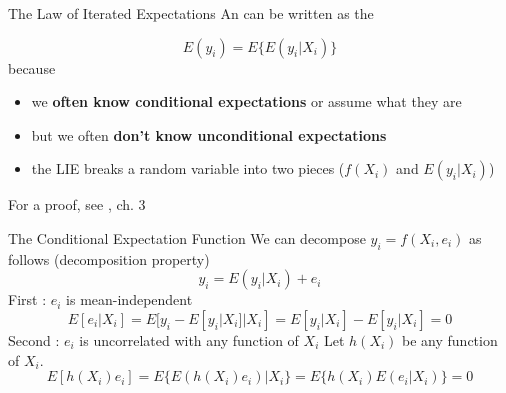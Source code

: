 \begin{frame}{The Law of Iterated Expectations}
An  can be written as the 

\begin{equation}
E(y_i)=E\{E(y_i| X_i)\}
\label{eq3}
\end{equation}
\vfill
{} because 
\begin{itemize}
\item we \textbf{often know conditional expectations} or assume what they are
\item but we often \textbf{don't know unconditional expectations}
\item the LIE breaks a random variable into two pieces ($f(X_i)$ and $E(y_i|X_i)$)
\end{itemize}
\vfill
For a proof, see \citet{angrist_2009}, ch. 3
\end{frame}


\begin{frame}{The Conditional Expectation Function}
We can decompose $y_i=f(X_i,e_i)$ as follows (decomposition property)
\begin{equation}
y_i=E(y_i|X_i)+e_i
\label{eq4}
\end{equation}
\vfill
First : $e_i$ is mean-independent
\begin{equation}
E[e_i|X_i]=E[y_i-E[y_i|X_i]|X_i]=E[y_i|X_i]-E[y_i|X_i]=0
\label{eq5}
\end{equation}
\vfill
\pause
Second : $e_i$ is uncorrelated with any function of $X_i$
\vfill
Let $h(X_i)$ be any function of $X_i$.
\begin{equation}
E[h(X_i)e_i]=E\{E(h(X_i)e_i)|X_i \}=E\{ h(X_i) E(e_i|X_i)\}=0
\label{eq6}
\end{equation}

\end{frame}


